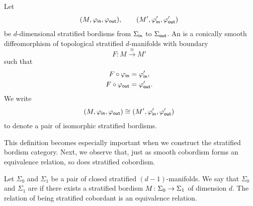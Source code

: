 \begin{definition}\label{ch5:: def: iso bord str}
    Let 
    \begin{equation}
    (M,\varphi_{\sf in},\varphi_{\sf out}),\qquad (M',\varphi'_{\sf in},\varphi'_{\sf out})
    \end{equation}
    be $d$-dimensional stratified bordisms from $\Sigma_{\sf in}$ to $\Sigma_{\sf out}$.
    An  is a conically smooth diffeomorphism of topological stratified $d$-manifolds with boundary
    \begin{equation}
    F\colon M \xrightarrow{\;\cong\;} M'
    \end{equation}
    such that
    \begin{align*}
        F\circ \varphi_{\sf in} &= \varphi'_{\sf in},\\
        F\circ \varphi_{\sf out} &= \varphi'_{\sf out}.
    \end{align*}
    We write 
    \begin{equation}
        (M,\varphi_{\sf in},\varphi_{\sf out})\cong (M',\varphi'_{\sf in},\varphi'_{\sf out})
    \end{equation}
    to denote a pair of isomorphic stratified bordisms.
\end{definition}

This definition becomes especially important when we construct the stratified bordism category. Next, we observe that, just as smooth cobordism forms an equivalence relation, so does stratified cobordism. 

\begin{proposition}
    Let $\Sigma_0$ and $\Sigma_1$ be a pair of closed stratified $(d-1)$-manifolds. We say that $\Sigma_0$ and $\Sigma_1$ are  if there exists a stratified bordism $M\colon \Sigma_0 \rightarrow \Sigma_1$ of dimension $d$. The relation of being stratified cobordant is an equivalence relation.
\end{proposition}

